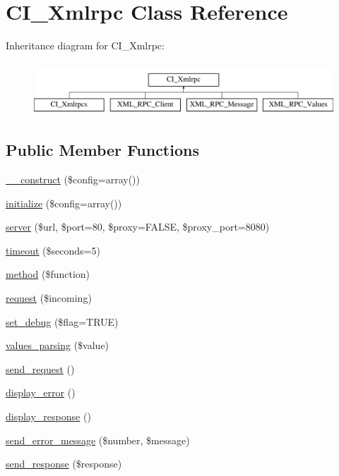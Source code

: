 \hypertarget{class_c_i___xmlrpc}{}\section{C\+I\+\_\+\+Xmlrpc Class Reference}
\label{class_c_i___xmlrpc}
Inheritance diagram for C\+I\+\_\+\+Xmlrpc\+:\begin{figure}[H]
\begin{center}
\leavevmode
\includegraphics[height=2.000000cm]{class_c_i___xmlrpc}
\end{center}
\end{figure}
\subsection*{Public Member Functions}
\begin{DoxyCompactItemize}
\item 
\hyperlink{class_c_i___xmlrpc_af7f9493844d2d66e924e3c1df51ce616}{\+\_\+\+\_\+construct} (\$config=array())
\item 
\hyperlink{class_c_i___xmlrpc_a481385e36d920f5a5005ace05c6cd016}{initialize} (\$config=array())
\item 
\hyperlink{class_c_i___xmlrpc_a9969815a7195f6915eb73afcab3f9e9e}{server} (\$url, \$port=80, \$proxy=F\+A\+L\+S\+E, \$proxy\+\_\+port=8080)
\item 
\hyperlink{class_c_i___xmlrpc_ada3149e6290a7991c7dfc88c6c90f2db}{timeout} (\$seconds=5)
\item 
\hyperlink{class_c_i___xmlrpc_a3d7e090549ec52eba8cf65598eefa72c}{method} (\$function)
\item 
\hyperlink{class_c_i___xmlrpc_a10d4ec842c61f2301ecccc900500e4c8}{request} (\$incoming)
\item 
\hyperlink{class_c_i___xmlrpc_a277e289843ab2ff13a12441e1dd5cd37}{set\+\_\+debug} (\$flag=T\+R\+U\+E)
\item 
\hyperlink{class_c_i___xmlrpc_ae22fc267af5ff6330cb47172c78cc2c8}{values\+\_\+parsing} (\$value)
\item 
\hyperlink{class_c_i___xmlrpc_ad6f2431aec35ca073f3bdac3f0e8c66a}{send\+\_\+request} ()
\item 
\hyperlink{class_c_i___xmlrpc_adf0d809d39e17bc0e08387436db31386}{display\+\_\+error} ()
\item 
\hyperlink{class_c_i___xmlrpc_a3a8aedc2a1e6a67ad248dc6078ce8614}{display\+\_\+response} ()
\item 
\hyperlink{class_c_i___xmlrpc_a024ae8a44e09995c6d0b6cb50d8abd9a}{send\+\_\+error\+\_\+message} (\$number, \$message)
\item 
\hyperlink{class_c_i___xmlrpc_ac567feb54a4bda4cad24ff63d09267a1}{send\+\_\+response} (\$response)
\end{DoxyCompactItemize}
